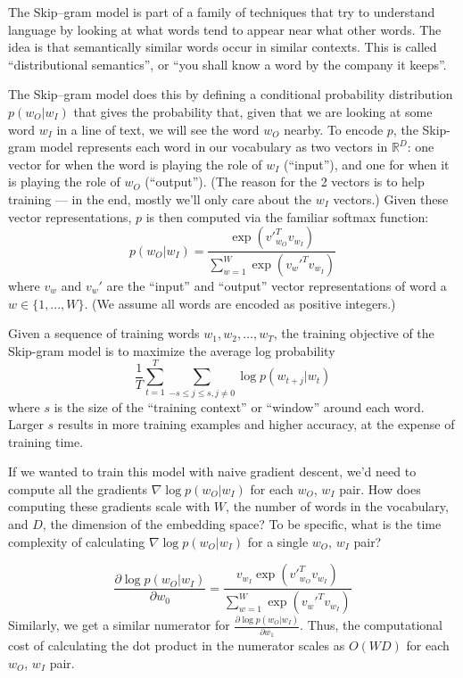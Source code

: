 The Skip--gram model is part of a family of techniques that try to understand language by looking at what words tend to appear near what other words.  The idea is that semantically similar words occur in similar contexts.  This is called ``distributional semantics'', or ``you shall know a word by the company it keeps''.  

The Skip--gram model does this by defining a conditional probability distribution $p(w_O|w_I)$ that gives the probability that, given that we are looking at some word $w_I$ in a line of text, we will see the word $w_O$ nearby.  To encode $p$, the Skip-gram model represents each word in our vocabulary as two vectors in $\mathbb{R}^D$: one vector for when the word is playing the role of $w_I$ (``input''), and one for when it is playing the role of $w_O$ (``output'').  (The reason for the 2 vectors is to help training --- in the end, mostly we'll only care about the $w_I$ vectors.)  Given these vector representations, $p$ is then computed via the familiar softmax function:
\[ p(w_O|w_I) = \frac{\exp \left({v'}_{w_O}^T v_{w_I} \right)}{\sum_{w=1}^W \exp \left( {v_w'}^T v_{w_I} \right)} \tag{2} \label{eqn:softmax} \]
where $v_w$ and $v_w'$ are the ``input'' and ``output'' vector representations of word a $w \in \{1, ..., W\}$.  (We assume all words are encoded as positive integers.)

Given a sequence of training words $w_1, w_2, \hdots, w_T$, the training objective of the Skip-gram model is to maximize the average log probability
\[ \frac{1}{T}  \sum_{t=1}^T \sum_{-s \leq j \leq s, j \neq 0} \log p(w_{t+j}|w_t) \tag{1}\label{eqn:opt} \] where $s$ is the size of the ``training context'' or ``window'' around each word. Larger $s$ results in more training examples and higher accuracy, at the expense of training time.

\problem[5]
If we wanted to train this model with naive gradient descent, we'd need to compute all the gradients $\nabla \log p(w_O|w_I)$ for each $w_O$, $w_I$ pair.  How does computing these gradients scale with $W$, the number of words in the vocabulary, and $D$, the dimension of the embedding space? To be specific, what is the time complexity of calculating $\nabla \log p(w_O|w_I)$ for a single $w_O$, $w_I$ pair?

\begin{solution}
	\begin{equation}
		\frac{\partial \log p(w_O|w_I)}{\partial w_0} = \frac{v_{w_I}\exp \left({v'}_{w_O}^T v_{w_I} \right)}{\sum _{w=1}^W\exp \left ({v_w'}^T v_{w_I} \right)}
	\end{equation}
	Similarly, we get a similar numerator for $\frac{\partial \log p(w_O|w_I)}{\partial w_1}$. Thus, the computational cost of calculating the dot product in the numerator scales as $O(WD)$ for each $w_O$, $w_I$ pair.
\end{solution}


